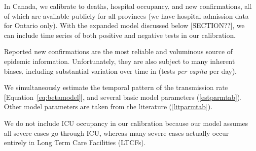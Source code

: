 \documentclass[12pt]{article}\usepackage[]{graphicx}\usepackage[]{color}
\begin{document}
In Canada, we calibrate to deaths, hospital occupancy, and new confirmations, all of which are available publicly for all provinces (we have hospital admission data for Ontario only).  
With the expanded model discussed below [SECTION??], we can include time series of both positive and negative tests in our calibration. 

 

Reported new confirmations are the most reliable and voluminous source of epidemic information.
Unfortunately, they are also subject to many inherent biases, including substantial variation over time in  (\ie tests \emph{per capita} per day).

We simultaneously estimate the temporal pattern of the transmission rate [Equation~\eqref{eq:betamodel}], and several basic model parameters (\cref{estparmtab}).  
Other model parameters are taken from the literature (\cref{litparmtab}).

We do not include ICU occupancy in our calibration because our model assumes all severe cases go through ICU, whereas many severe cases actually occur entirely in Long Term Care Facilities (LTCFs). 


\end{document}
